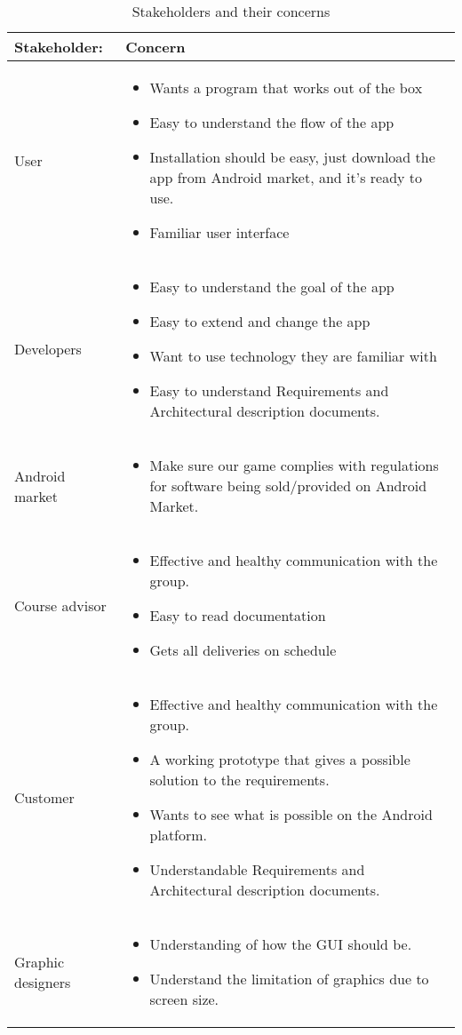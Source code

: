 \begin{table}
\begin{tabular}{p{3.5cm}|p{11.5cm}}
\textbf{Stakeholder:} & \textbf{Concern} \\ \hline \hline
User & 
\begin{itemize}
\item{} Wants a program that works out of the box
\item{} Easy to understand the flow of the app
\item{} Installation should be easy, just download the app from   Android market, and it’s ready to use.
\item{} Familiar user interface
\end{itemize}\\ \hline
Developers & 
\begin{itemize}
\item{}Easy to understand the goal of the app
\item{}Easy to extend and change the app
\item{}Want to use technology they are familiar with
\item{}Easy to understand Requirements and Architectural description documents.
\end{itemize}\\ \hline
Android market & 
\begin{itemize}
\item{}Make sure our game complies with regulations for software being sold/provided on Android Market.
\end{itemize}\\ \hline
Course advisor & 
\begin{itemize}
\item{}Effective and healthy communication with the group.
\item{}Easy to read documentation
\item{}Gets all deliveries on schedule
\end{itemize}\\ \hline
Customer & 
\begin{itemize}
\item{}Effective and healthy communication with the group.
\item{}A working prototype that gives a possible solution to the requirements.
\item{}Wants to see what is possible on the Android platform.
\item{}Understandable Requirements and Architectural description documents.
\end{itemize}\\ \hline
Graphic designers & 
\begin{itemize}
\item{}Understanding of how the GUI should be.
\item{}Understand the limitation of graphics due to screen size.
\end{itemize}
\end{tabular}
\caption{Stakeholders and their concerns} \label{tab:stakeholders}
\end{table}